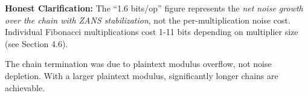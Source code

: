 \vspace{0.2cm}
\textbf{Honest Clarification:}
The ``1.6 bits/op'' figure represents the \textit{net noise growth over the chain with ZANS stabilization}, not the per-multiplication noise cost. Individual Fibonacci multiplications cost 1-11 bits depending on multiplier size (see Section 4.6).

The chain termination was due to plaintext modulus overflow, not noise depletion. With a larger plaintext modulus, significantly longer chains are achievable.
